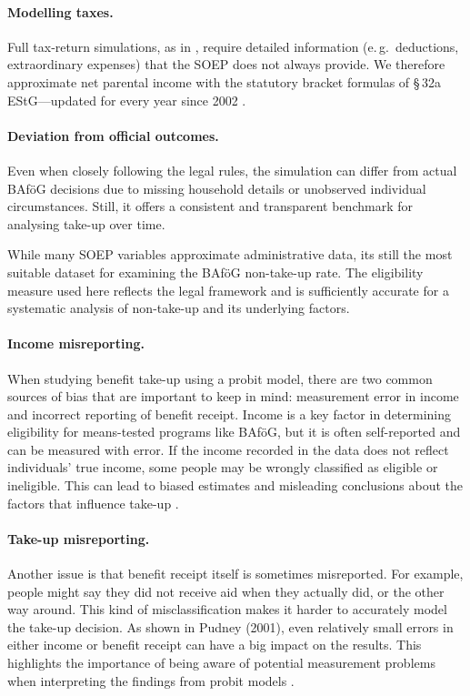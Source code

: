 \paragraph{Modelling taxes.}
Full tax‑return simulations, as in \cite{herber_non-take-up_2019}, require detailed information (e.\,g.\ deductions, extraordinary expenses) that the SOEP does not always provide.  
We therefore approximate net parental income with the statutory bracket formulas of §\,32a EStG—updated for every year since 2002 \citep{estg_law,estg_2025,estg_2024,estg_2023,estg_2022,estg_2021,estg_2020,estg_2019,estg_2018,estg_2017,estg_2016,estg_2015,estg_2014,estg_2013,estg_2012,estg_2007,estg_2006,estg_lohninfo_2012}.  
\paragraph{Deviation from official outcomes.}
Even when closely following the legal rules, the simulation can differ from actual BAföG decisions due to missing household details or unobserved individual circumstances. 
Still, it offers a consistent and transparent benchmark for analysing take-up over time.

While many SOEP variables approximate administrative data, its still the most suitable dataset for examining the BAföG non-take-up rate. 
The eligibility measure used here reflects the legal framework and is sufficiently accurate for a systematic analysis of non-take-up and its underlying factors.


\paragraph{Income misreporting.}
When studying benefit take-up using a probit model, there are two common sources of bias that are important to keep in mind: measurement error in income and incorrect reporting of benefit receipt. Income is a key factor in determining eligibility for means-tested programs like BAföG, but it is often self-reported and can be measured with error. If the income recorded in the data does not reflect individuals' true income, some people may be wrongly classified as eligible or ineligible. This can lead to biased estimates and misleading conclusions about the factors that influence take-up \cite{pudney_impact_2001}.

\paragraph{Take-up misreporting.} Another issue is that benefit receipt itself is sometimes misreported. For example, people might say they did not receive aid when they actually did, or the other way around. This kind of misclassification makes it harder to accurately model the take-up decision. As shown in Pudney (2001), even relatively small errors in either income or benefit receipt can have a big impact on the results. This highlights the importance of being aware of potential measurement problems when interpreting the findings from probit models \cite{pudney_impact_2001}.

